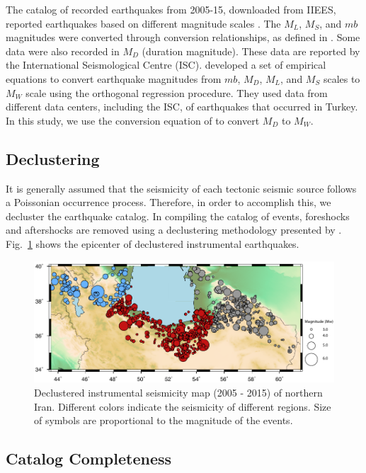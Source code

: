 The catalog of recorded earthquakes from 2005-15, downloaded from IIEES, reported earthquakes based on different magnitude scales \citep{IIEES}. The  $M_L$,  $M_S$, and  $mb$  magnitudes were converted through conversion relationships, as defined in  \citet{Zare2014}. Some data were also recorded in  $M_D$  (duration magnitude). These data are reported by the International Seismological Centre (ISC).   \citet{Deniz2010}  developed a set of empirical equations to convert earthquake magnitudes from  $mb$,  $M_D$,  $M_L$, and  $M_S$  scales to  $M_W$  scale using the orthogonal regression procedure. They used data from different data centers, including the ISC, of earthquakes that occurred in Turkey. In this study, we use the conversion equation of  \citet{Deniz2010}  to convert  $M_D$  to  $M_W$. 

\subsection{Declustering} 

It is generally assumed that the seismicity of each tectonic seismic source follows a Poissonian occurrence process. Therefore, in order to accomplish this, we decluster the earthquake catalog. In compiling the catalog of events, foreshocks and aftershocks are removed using a declustering methodology  presented by \citet{Gardner1974}. Fig.~\ref{fig:seismicity}  shows the epicenter of declustered instrumental  earthquakes.

\begin{figure}[t]
\centering
\includegraphics[scale=1]{figures/pdf/Figure04.pdf} 
\caption{Declustered instrumental seismicity map (2005 - 2015) of northern Iran. Different colors indicate the seismicity of different regions. Size of symbols are proportional to the magnitude of the events.}
\label{fig:seismicity}
\end{figure}
 
\subsection{Catalog Completeness}

